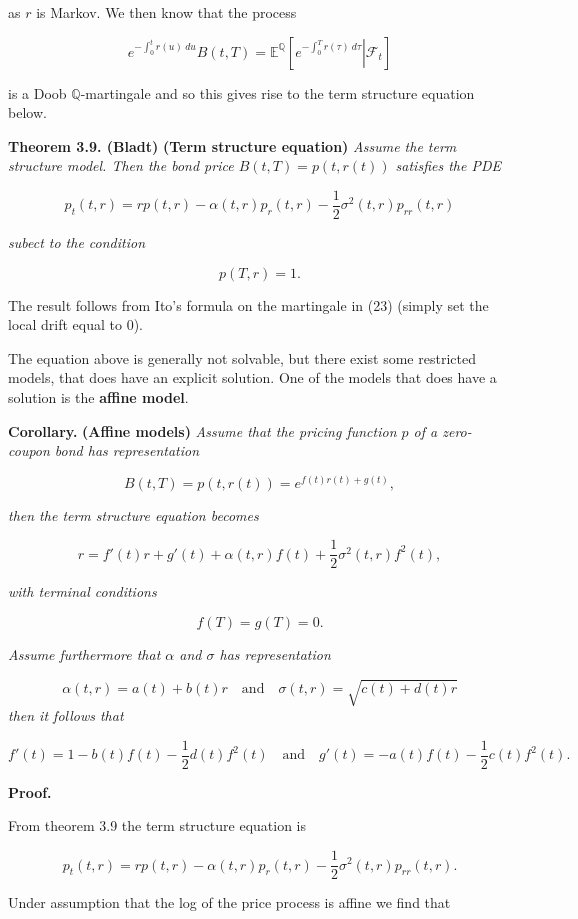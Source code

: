 \documentclass[a4paper,10pt,openany]{book}
\begin{document}
as \(r\) is Markov. We then know that the process

\[
e^{-\int_0^t r(u)\ du}B(t,T)=\mathbb E^{\mathbb Q}\left[\left.e^{-\int_0^Tr(\tau)\ d\tau} \right\vert \mathcal{F}_t\right]\tag{23}
\]

is a Doob \(\mathbb Q\)-martingale and so this gives rise to the term structure equation below.

\textbf{Theorem 3.9. (Bladt)} \textbf{(Term structure equation)} \emph{Assume the term structure model. Then the bond price \(B(t,T)=p(t,r(t))\) satisfies the PDE}

\[
p_t(t,r)=rp(t,r)-\alpha(t,r)p_r(t,r)-\frac{1}{2}\sigma^2(t,r)p_{rr}(t,r)
\]

\emph{subect to the condition}

\[
p(T,r)=1.
\]

The result follows from Ito's formula on the martingale in (23) (simply set the local drift equal to 0).

The equation above is generally not solvable, but there exist some restricted models, that does have an explicit solution. One of the models that does have a solution is the \textbf{affine model}.

\textbf{Corollary.} \textbf{(Affine models)} \emph{Assume that the pricing function \(p\) of a zero-coupon bond has representation}

\[
B(t,T)=p(t,r(t))=e^{f(t)r(t)+g(t)},
\]

\emph{then the term structure equation becomes}

\[
r=f'(t)r+g'(t)+\alpha(t,r)f(t)+\frac{1}{2}\sigma^2(t,r)f^2(t),
\]

\emph{with terminal conditions}

\[
f(T)=g(T)=0.
\]

\emph{Assume furthermore that \(\alpha\) and \(\sigma\) has representation}

\[
\alpha(t,r)=a(t)+b(t)r\quad \text{and}\quad\sigma(t,r)=\sqrt{c(t)+d(t)r}
\]
\emph{then it follows that}

\[
f'(t)=1-b(t)f(t)-\frac{1}{2}d(t)f^2(t)\quad \text{and}\quad g'(t)=-a(t)f(t)-\frac{1}{2}c(t)f^2(t).
\]

\textbf{Proof.}

From theorem 3.9 the term structure equation is

\[
p_t(t,r)=rp(t,r)-\alpha(t,r)p_r(t,r)-\frac{1}{2}\sigma^2(t,r)p_{rr}(t,r).
\]

Under assumption that the log of the price process is affine we find that
\end{document}
